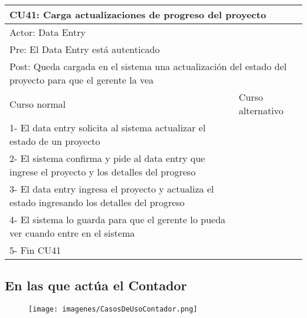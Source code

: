\begin{table}[H]
  \begin{adjustbox}{max width = \textwidth}
  \begin{tabular}{|l|l|}
    \hline
    \multicolumn{2}{|l|}{CU41: Carga actualizaciones de progreso del proyecto
} \\\hline
    \multicolumn{2}{|l|}{Actor: Data Entry} \\\hline
    \multicolumn{2}{|l|}{Pre: El Data Entry está autenticado} \\\hline
    \multicolumn{2}{|l|}{Post: Queda cargada en el sistema una actualización del estado del proyecto para que el gerente la vea} \\\hline
     Curso normal & Curso alternativo\\ \hline
     1- El data entry solicita al sistema actualizar el estado de un proyecto & \\ \hline
     2- El sistema confirma y pide al data entry que ingrese el proyecto y los detalles del progreso & \\ \hline
	 3- El data entry ingresa el proyecto y actualiza el estado ingresando los detalles del progreso & \\ \hline
   4- El sistema lo guarda para que el gerente lo pueda ver cuando entre en el sistema & \\ \hline
   5- Fin CU41 & \\ \hline
  \end{tabular}
  \end{adjustbox}
\end{table}


\subsection{En las que actúa el Contador}

\begin{figure}[H]
    \texttt{[image: imagenes/CasosDeUsoContador.png]}
\end{figure}

